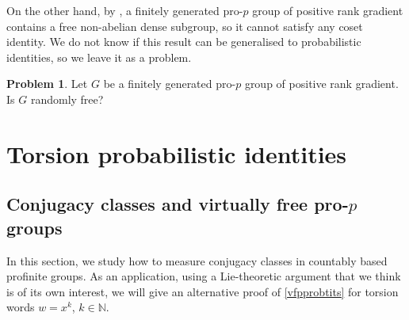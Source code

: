 \documentclass[a4paper,10pt]{amsart}
\theoremstyle{plain}
\theoremstyle{definition}
\newtheorem{prob}[thm]{Problem}
\newcommand{\bbN}{\mathbb{N}}
\numberwithin{equation}{section}
\begin{document}
    On the other hand, by \cite[Theorem 1.7]{Ni}, a finitely generated pro-$p$ group of positive rank gradient contains a free non-abelian dense subgroup, so it cannot satisfy any coset identity. We do not know if this result can be generalised to probabilistic identities, so we leave it as a problem.
	\begin{prob}\label{prob:rank_grad}
		Let $G$ be a finitely generated pro-$p$ group of positive rank gradient. Is $G$ randomly free? 
	\end{prob}


	\section{Torsion probabilistic identities}\label{sec:torsion}
    \subsection{Conjugacy classes and virtually free pro-\texorpdfstring{$p$}{p} groups}\label{subsec:virt_free_torsion}
	In this section, we study how to measure conjugacy classes in countably based profinite groups. As an application, using a Lie-theoretic argument that we think is of its own interest, we will give an alternative proof of \cref{vfpprobtits} for torsion words $w=x^k$, $k\in\bbN$.
    
\end{document}
